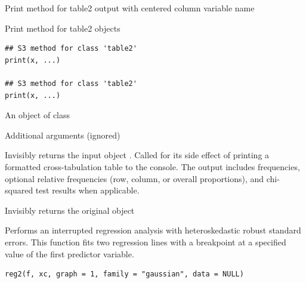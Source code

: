 \documentclass[a4paper]{book}
\begin{document}
%
\begin{Description}
Print method for table2 output with centered column variable name

Print method for table2 objects
\end{Description}
%
\begin{Usage}
\begin{verbatim}
## S3 method for class 'table2'
print(x, ...)

## S3 method for class 'table2'
print(x, ...)
\end{verbatim}
\end{Usage}
%
\begin{Arguments}
\begin{ldescription}
\item[\code{x}] An object of class 

\item[\code{...}] Additional arguments (ignored)
\end{ldescription}
\end{Arguments}
%
\begin{Value}
Invisibly returns the input object . Called for its side effect 
of printing a formatted cross-tabulation table to the console. The output 
includes frequencies, optional relative frequencies (row, column, or overall 
proportions), and chi-squared test results when applicable.

Invisibly returns the original object
\end{Value}
%
\begin{Description}
Performs an interrupted regression analysis with heteroskedastic robust standard errors.
This function fits two regression lines with a breakpoint at a specified value of the
first predictor variable.
\end{Description}
%
\begin{Usage}
\begin{verbatim}
reg2(f, xc, graph = 1, family = "gaussian", data = NULL)
\end{verbatim}
\end{Usage}
%
\end{document}
